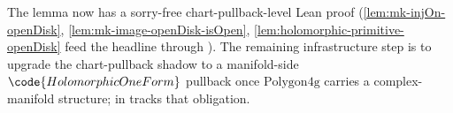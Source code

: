 \begin{formalizationnote}
The lemma now has a sorry-free chart-pullback-level Lean proof
(\ref{lem:mk-injOn-openDisk}, \ref{lem:mk-image-openDisk-isOpen},
\ref{lem:holomorphic-primitive-openDisk} feed the headline through
). The remaining infrastructure step
is to upgrade the chart-pullback shadow to a manifold-side
\(\code{HolomorphicOneForm}\) pullback once
\(\mathrm{Polygon4g}\) carries a complex-manifold structure;
 in
 tracks that obligation.
\end{formalizationnote}
